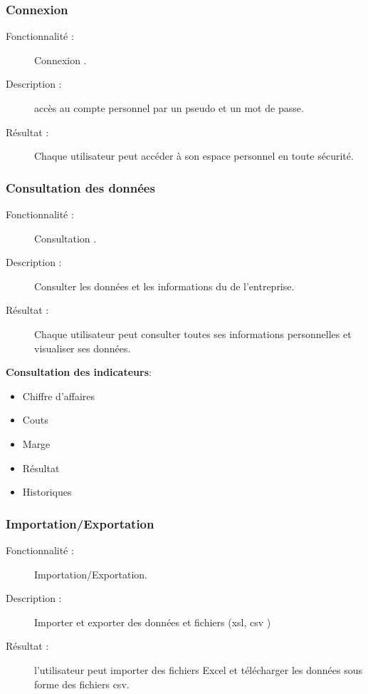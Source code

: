 \documentclass[12pt]{article}
\begin{document}
\subsubsection{Connexion}
\begin{description}


\item[Fonctionnalité :] Connexion .

\item[Description :]  accès au compte personnel par un pseudo et un mot de passe.

\item[Résultat :]  Chaque utilisateur peut accéder à
son espace personnel en toute sécurité.
\end{description}

\subsubsection{ Consultation des données}
\begin{description}

\item[Fonctionnalité :] Consultation .

\item[Description :]  Consulter les données et les informations du de l'entreprise.

\item[Résultat :]  Chaque utilisateur peut consulter toutes ses informations personnelles  et visualiser ses 
données.
\end{description}

\textbf{Consultation des indicateurs}:
\begin{itemize}
\item  Chiffre d’affaires
\item Couts
\item Marge
\item Résultat
\item Historiques
\end{itemize}


\subsubsection{ Importation/Exportation}
\begin{description}

\item[Fonctionnalité :] Importation/Exportation.

\item[Description :]  Importer et exporter des données et fichiers (xsl, csv )

\item[Résultat :]  l'utilisateur peut importer des fichiers Excel et télécharger les données sous forme
 des  fichiers csv.
\end{description}
\end{document}
